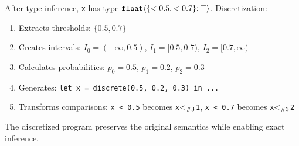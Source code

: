 After type inference, \texttt{x} has type $\text{\ttfamily\bfseries float}\langle \{<0.5, <0.7\}; \top \rangle$. Discretization:
\begin{enumerate}
    \item Extracts thresholds: $\{0.5, 0.7\}$
    \item Creates intervals: $I_0 = (-\infty, 0.5)$, $I_1 = [0.5, 0.7)$, $I_2 = [0.7, \infty)$
    \item Calculates probabilities: $p_0 = 0.5$, $p_1 = 0.2$, $p_2 = 0.3$
    \item Generates: \texttt{let x = discrete(0.5, 0.2, 0.3) in ...}
    \item Transforms comparisons: \texttt{x < 0.5} becomes \texttt{x}$<_{\#{3}}$\texttt{1}, \texttt{x < 0.7} becomes \texttt{x}$<_{\#{3}}$\texttt{2}
\end{enumerate}

The discretized program preserves the original semantics while enabling exact inference.

